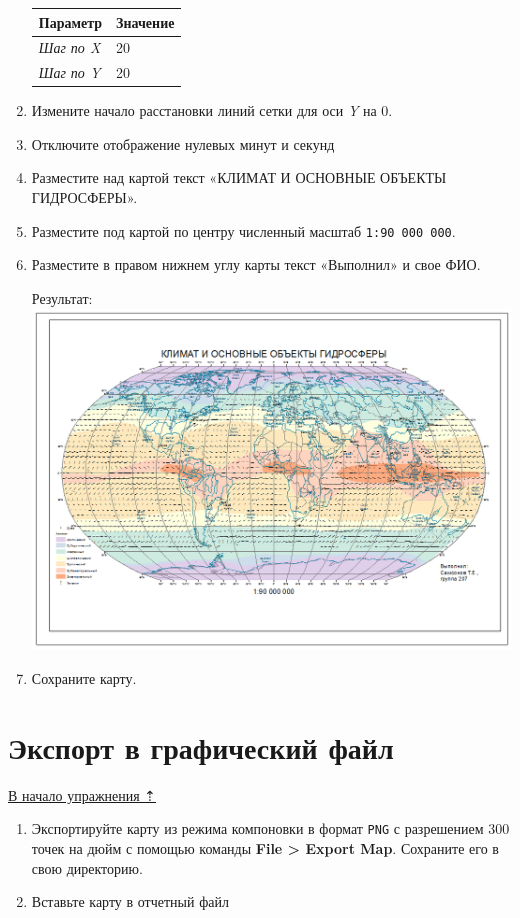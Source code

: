 \documentclass[]{book}
\theoremstyle{definition}
\theoremstyle{definition}
\theoremstyle{definition}
\theoremstyle{remark}
\begin{document}
\begin{enumerate}
  \begin{longtable}[]{@{}ll@{}}
  \toprule
  \textbf{Параметр} & \textbf{Значение}\tabularnewline
  \midrule
  \endhead
  \emph{Шаг по X} & 20\tabularnewline
  \emph{Шаг по Y} & 20\tabularnewline
  \bottomrule
  \end{longtable}
\item
  Измените начало расстановки линий сетки для оси \emph{Y} на 0.
\item
  Отключите отображение нулевых минут и секунд
\item
  Разместите над картой текст «КЛИМАТ И ОСНОВНЫЕ ОБЪЕКТЫ ГИДРОСФЕРЫ».
\item
  Разместите под картой по центру численный масштаб
  \texttt{1:90\ 000\ 000}.
\item
  Разместите в правом нижнем углу карты текст «Выполнил» и свое ФИО.

  Результат: \includegraphics{images/Ex03/image35.png}
\item
  Сохраните карту.
\end{enumerate}

\hypertarget{map-design-climates-export}{%
\section{Экспорт в графический файл}\label{map-design-climates-export}}

\protect\hyperlink{map-design-climates}{В начало упражнения ⇡}

\begin{enumerate}
\def\labelenumi{\arabic{enumi}.}
\item
  Экспортируйте карту из режима компоновки в формат \texttt{PNG} с
  разрешением 300 точек на дюйм с помощью команды \textbf{File
  \textgreater{} Export Map}. Сохраните его в свою директорию.
\item
  Вставьте карту в отчетный файл
\end{enumerate}
\end{document}
